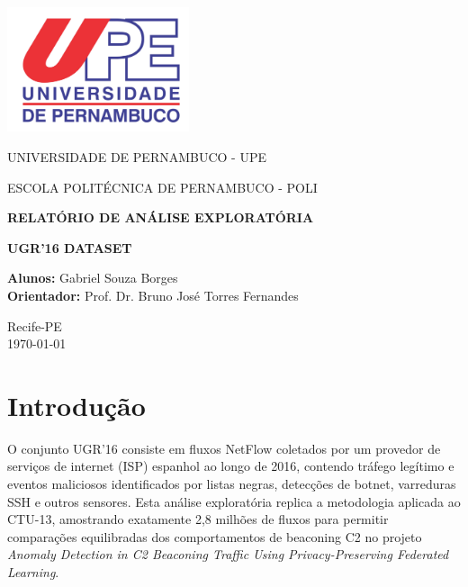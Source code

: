 \documentclass[a4paper, 12pt]{article}
\begin{document}
\begin{titlepage}
    \centering
    \includegraphics[width=0.4\textwidth]{upe.png}\par
    \vspace{1.5cm}

    {\large UNIVERSIDADE DE PERNAMBUCO - UPE}\par
    \vspace{0.2cm}
    {\large ESCOLA POLITÉCNICA DE PERNAMBUCO - POLI}

    \vfill

    {\Large \textbf{RELATÓRIO DE ANÁLISE EXPLORATÓRIA}}\par

    \vspace{1cm}

    {\huge \bfseries UGR'16 DATASET }\par

    \vfill

    \begin{flushleft}
    \large
        \textbf{Alunos:} Gabriel Souza Borges \\
        \textbf{Orientador:} Prof. Dr. Bruno José Torres Fernandes \\
    \end{flushleft}

    \vfill

    \large
    Recife-PE \\
    \today
\end{titlepage}

\tableofcontents
\listoffigures
\listoftables

\newpage

\section{Introdução}
O conjunto UGR'16 consiste em fluxos NetFlow coletados por um provedor de serviços de internet (ISP) espanhol ao longo de 2016, contendo tráfego legítimo e eventos maliciosos identificados por listas negras, detecções de botnet, varreduras SSH e outros sensores. Esta análise exploratória replica a metodologia aplicada ao CTU-13, amostrando exatamente 2{,}8 milhões de fluxos para permitir comparações equilibradas dos comportamentos de beaconing C2 no projeto \textit{Anomaly Detection in C2 Beaconing Traffic Using Privacy-Preserving Federated Learning}.
\end{document}

